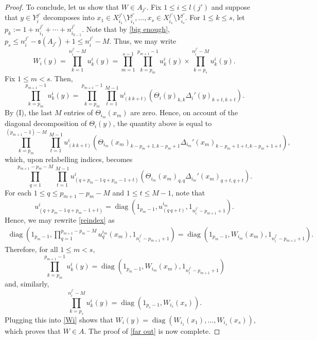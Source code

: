 \documentclass[12pt]{amsart}
\numberwithin{equation}{section}
\theoremstyle{definition}
\theoremstyle{remark}
\newcommand{\diag}{\operatorname{diag}}
\begin{document}
\begin{proof}
	To conclude, let us show that $W\in A_{j'}$. Fix $1\leq i\leq  l (j')$ and suppose that $y\in Y_{i}^{j'}$ decomposes into $x_{1}\in X_{i_{1}}^{j'}\setminus Y_{i_{1}}^{j'},\ldots,x_{s}\in X_{i_{s}}^{j'}\setminus Y_{i_{s}}^{j'}$. For $1\leq k\leq s$, let $p_{k}:=1+n^{j'}_{i_{1}}+\cdots+n^{j'}_{i_{k-1}}$. Note that by \autoref{big enough}, $p_{s}\leq n_{i}^{j'}-\mathfrak{s}(A_{j'})+1\leq n_{i}^{j'}-M$. Thus, we may write
	\begin{equation}
	\label{Wi}
	W_{i}(y)=\prod_{k=1}^{n_{i}^{j'}-M}u_{k}^{i}(y)=\prod_{m=1}^{s-1}\prod_{k=p_{m}}^{p_{m+1}-1}u_{k}^{i}(y)\times\prod_{k=p_{s}}^{n_{i}^{j'}-M}u_{k}^{i}(y).
	\end{equation}
	Fix $1\leq m<s$. Then,
	$$
	\prod_{k=p_{m}}^{p_{m+1}-1}u_{k}^{i}(y)=\prod_{k=p_{m}}^{p_{m+1}-1}\prod_{t=1}^{M-1}u_{(k \ k+t)}^{i}(\Theta_{i}(y)_{k,k}\Delta_{i}'(y)_{k+t,k+t}).
	$$ 
	By (I), the last $M$ entries of $\Theta_{i_{m}}(x_{m})$ are zero. Hence, on account of the diagonal decomposition of $\Theta_{i}(y)$, the quantity above is equal to
	$$
	\prod_{k=p_{m}}^{(p_{m+1}-1)-M}\prod_{t=1}^{M-1}u_{(k \ k+t)}^{i}(\Theta_{i_{m}}(x_{m})_{k-p_{m}+1,k-p_{m}+1}\Delta_{i_{m}}'(x_{m})_{k-p_{m}+1+t,k-p_{m}+1+t}),
	$$
	which, upon relabelling indices, becomes
	\begin{equation}
	\label{reindex}
	\prod_{q=1}^{p_{m+1}-p_{m}-M}\prod_{t=1}^{M-1}u^{i}_{(q+p_{m}-1 \ q+p_{m}-1+t)}(\Theta_{i_{m}}(x_{m})_{q,q}\Delta_{i_{m}}'(x_{m})_{q+t,q+t}).
	\end{equation}
	For each $1\leq q\leq p_{m+1}-p_{m}-M$ and $1\leq t\leq M-1$, note that 
	$$
	u^{i}_{(q+p_{m}-1 \ q+p_{m}-1+t)}=\diag(1_{p_{m}-1},u_{(q \ q+t)}^{i_{m}},1_{n_{i}^{j'}-p_{m+1}+1}).
	$$
	Hence, we may rewrite \autoref{reindex} as
	$$
	\begin{aligned}
	\diag\left(1_{p_{m}-1},\prod_{q=1}^{p_{m+1}-p_{m}-M}u_{q}^{i_{m}}(x_{m}),1_{n_{i}^{j'}-p_{m+1}+1}\right)
	=\diag\left(1_{p_{m}-1},W_{i_{m}}(x_{m}),1_{n_{i}^{j'}-p_{m+1}+1}\right).
	\end{aligned}
	$$
	Therefore, for all $1\leq m <s$,
	$$
	\prod_{k=p_{m}}^{p_{m+1}-1}u_{k}^{i}(y)=\diag\left(1_{p_{m}-1},W_{i_{m}}(x_{m}),1_{n_{i}^{j'}-p_{m+1}+1}\right)
	$$
	and, similarly, 
	$$
	\prod_{k=p_{s}}^{n_{i}^{j'}-M}u_{k}^{i}(y)=\diag(1_{p_{s}-1},W_{i_{s}}(x_{s})).
	$$
	Plugging this into \autoref{Wi} shows that $W_{i}(y)=\diag(W_{i_{1}}(x_{1}),\ldots,W_{i_{s}}(x_{s}))$, which proves that $W\in A$. The proof of \autoref{far out} is now complete.
\end{proof}
\end{document}
